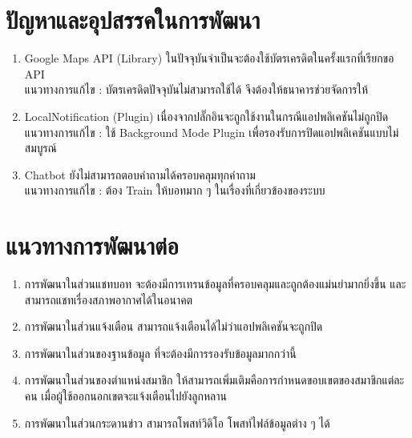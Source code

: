\section{ปัญหาและอุปสรรคในการพัฒนา}
  \begin{enumerate}
   \item Google Maps API (Library) ในปัจจุบันจำเป็นจะต้องใช้บัตรเครดิตในครั้งแรกที่เรียกขอ API \\ 
   แนวทางการแก้ไข : บัตรเครดิตปัจจุบันไม่สามารถใช้ได้ จึงต้องให้ธนาคารช่วยจัดการให้

   \item LocalNotification (Plugin) เนื่องจากปลั๊กอินจะถูกใช้งานในกรณีแอปพลิเคชันไม่ถูกปิด \\ 
   แนวทางการแก้ไข : ใช้ Background Mode Plugin เพื่อรองรับการปิดแอปพลิเคชันแบบไม่สมบูรณ์

   \item Chatbot ยังไม่สามารถตอบคำถามได้ครอบคลุมทุกคำถาม \\ 
   แนวทางการแก้ไข : ต้อง Train ให้บอทมาก ๆ ในเรื่องที่เกี่ยวข้องของระบบ
    
  \end{enumerate}

\section{แนวทางการพัฒนาต่อ}
\begin{enumerate}
	\item การพัฒนาในส่วนแชทบอท จะต้องมีการเทรนข้อมูลที่ครอบคลุมและถูกต้องแม่นยำมากยิ่งขึ้น และสามารถแชทเรื่องสภาพอากาศได้ในอนาคต
 	\item การพัฒนาในส่วนแจ้งเตือน สามารถแจ้งเตือนได้ไม่ว่าแอปพลิเคชันจะถูกปิด
 	\item การพัฒนาในส่วนของฐานข้อมูล ที่จะต้องมีการรองรับข้อมูลมากกว่านี้
  \item การพัฒนาในส่วนของตำแหน่งสมาชิก ให้สามารถเพิ่มเติมคือการกำหนดขอบเขตของสมาชิกแต่ละคน เมื่อผู้ใช้ออกนอกเขตจะแจ้งเตือนไปยังลูกหลาน
  \item การพัฒนาในส่วนกระดานข่าว สามารถโพสท์วิดิโอ โพสท์ไฟล์ข้อมูลต่าง ๆ ได้
\end{enumerate}





